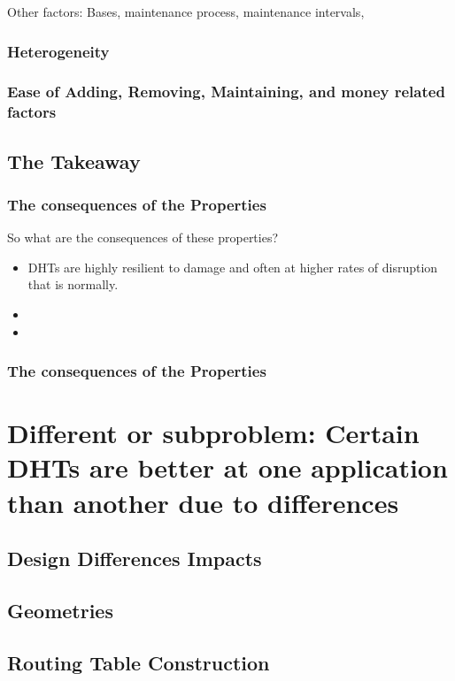 \documentclass[10pt,letterpaper]{report}
\begin{document}
Other factors: Bases, maintenance process, maintenance intervals,

\subsubsection{Heterogeneity}


\subsubsection{Ease of Adding, Removing, Maintaining, and money related factors}

\subsection{The Takeaway}


\subsubsection{The consequences of the Properties}
So what are the consequences of these properties?
\begin{itemize}
	\item DHTs are highly resilient to damage and often at higher rates of disruption that is normally.
	\item 
	\item 
\end{itemize}


\subsubsection{The consequences of the Properties}


\section{Different or subproblem: Certain DHTs are better at one application than another due to differences}
\subsection{Design Differences Impacts}
\subsection{Geometries}
\subsection{Routing Table Construction}
\end{document}

